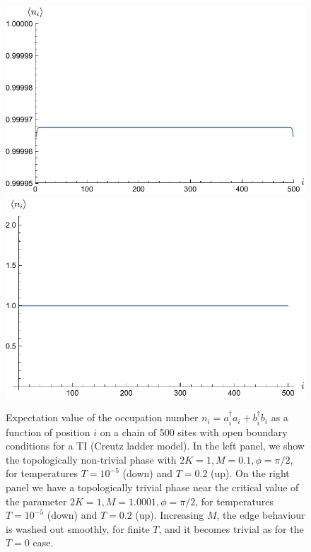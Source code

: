 \begin{figure}[h!]
\begin{minipage}{0.45\textwidth}
\end{minipage}
\begin{minipage}{0.45\textwidth}
\centering
\includegraphics[scale=0.55]{occupation_finite_T_trivial.pdf}
\includegraphics[scale=0.55]{occupation_zero_T_trivial.pdf}
\end{minipage}
\caption{Expectation value of the occupation number $n_i=a_i^\dagger a_i+b_i^{\dagger}b_i$ as a function of position $i$ on a chain of 500 sites with open boundary conditions for a TI (Creutz ladder model). In the left panel, we show the topologically non-trivial phase with $2K=1,M=0.1,\phi=\pi/2$, for temperatures $T=10^{-5}$ (down) and $T=0.2$ (up). On the right panel we have a topologically trivial phase near the critical value of the parameter $2K=1,M=1.0001,\phi=\pi/2$, for temperatures $T=10^{-5}$ (down) and $T=0.2$ (up). Increasing $M$, the edge behaviour is washed out smoothly, for finite $T$, and it becomes trivial as for the $T=0$ case.}
\label{fig:BG_occupation_number}
\end{figure}
